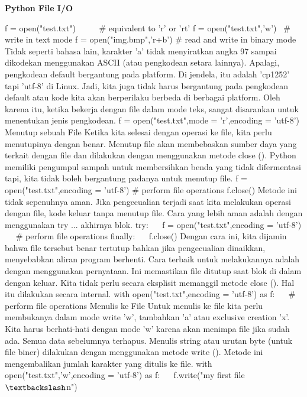 \begin{center}{\fontsize{24pt}{24pt}\selectfont \textbf{Python File I/O} \\}


\vspace{12pt}

\noindent 
f = open("test.txt")~~~~~  $  \#  $ equivalent to 'r' or 'rt'
f = open("test.txt",'w')~  $  \#  $ write in text mode 
f = open("img.bmp",'r+b')  $  \#  $ read and write in binary mode 
Tidak seperti bahasa lain, karakter 'a' tidak menyiratkan angka 97 sampai dikodekan menggunakan ASCII (atau pengkodean setara lainnya). 
Apalagi, pengkodean default bergantung pada platform. Di jendela, itu adalah 'cp1252' tapi 'utf-8' di Linux. 
Jadi, kita juga tidak harus bergantung pada pengkodean default atau kode kita akan berperilaku berbeda di berbagai platform. 
Oleh karena itu, ketika bekerja dengan file dalam mode teks, sangat disarankan untuk menentukan jenis pengkodean.
f = open("test.txt",mode = 'r',encoding = 'utf-8') 
Menutup sebuah File 
Ketika kita selesai dengan operasi ke file, kita perlu menutupinya dengan benar. 
Menutup file akan membebaskan sumber daya yang terkait dengan file dan dilakukan dengan menggunakan metode close (). 
Python memiliki pengumpul sampah untuk membersihkan benda yang tidak difermentasi tapi, kita tidak boleh bergantung padanya untuk menutup file. 
f = open("test.txt",encoding = 'utf-8') 
 $  \#  $ perform file operations
f.close() 
Metode ini tidak sepenuhnya aman. Jika pengecualian terjadi saat kita melakukan operasi dengan file, kode keluar tanpa menutup file. 
Cara yang lebih aman adalah dengan menggunakan try ... akhirnya blok. 
try:
~~ f = open("test.txt",encoding = 'utf-8')
~~  $  \#  $ perform file operations 
finally: 
~~ f.close() 
Dengan cara ini, kita dijamin bahwa file tersebut benar tertutup bahkan jika pengecualian dinaikkan, menyebabkan aliran program berhenti. 
Cara terbaik untuk melakukannya adalah dengan menggunakan pernyataan. Ini memastikan file ditutup saat blok di dalam dengan keluar. 
Kita tidak perlu secara eksplisit memanggil metode close (). Hal itu dilakukan secara internal.
with open("test.txt",encoding = 'utf-8') as f:
~~  $  \#  $ perform file operations
Menulis ke File 
Untuk menulis ke file kita perlu membukanya dalam mode write 'w', tambahkan 'a' atau exclusive creation 'x'. 
Kita harus berhati-hati dengan mode 'w' karena akan menimpa file jika sudah ada. Semua data sebelumnya terhapus. 
Menulis string atau urutan byte (untuk file biner) dilakukan dengan menggunakan metode write (). Metode ini mengembalikan jumlah karakter yang ditulis ke file. 
with open("test.txt",'w',encoding = 'utf-8') as f: 
~~ f.write("my first file $  \textbackslash  $n") 

\end{center}
